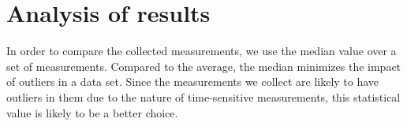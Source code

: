 \section{Analysis of results}
In order to compare the collected measurements, we use the median value over a set of measurements. Compared to the average, the median minimizes the impact of outliers in a data set. Since the measurements we collect are likely to have outliers in them due to the nature of time-sensitive measurements, this statistical value is likely to be a better choice.